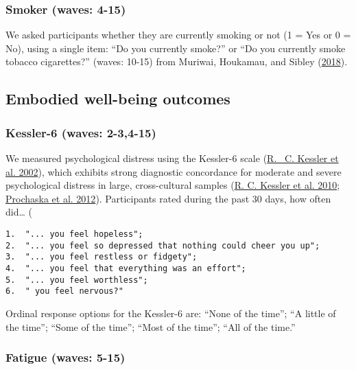 \documentclass[
  singlecolumn]{report}
\begin{document}
\hypertarget{smoker-waves-4-15}{%
\subsubsection{Smoker (waves: 4-15)}\label{smoker-waves-4-15}}

We asked participants whether they are currently smoking or not (1 = Yes
or 0 = No), using a single item: ``Do you currently smoke?'' or ``Do you
currently smoke tobacco cigarettes?'' (waves: 10-15) from Muriwai,
Houkamau, and Sibley
(\protect\hyperlink{ref-muriwai_looking_2018}{2018}).

\hypertarget{embodied-well-being-outcomes}{%
\subsection{Embodied well-being
outcomes}\label{embodied-well-being-outcomes}}

\hypertarget{kessler-6-waves-2-34-15}{%
\subsubsection{Kessler-6 (waves:
2-3,4-15)}\label{kessler-6-waves-2-34-15}}

We measured psychological distress using the Kessler-6 scale
(\protect\hyperlink{ref-kessler2002}{R. ~C. Kessler et al. 2002}), which
exhibits strong diagnostic concordance for moderate and severe
psychological distress in large, cross-cultural samples
(\protect\hyperlink{ref-kessler2010}{R. C. Kessler et al. 2010};
\protect\hyperlink{ref-prochaska2012}{Prochaska et al. 2012}).
Participants rated during the past 30 days, how often did\ldots{} (

\begin{verbatim}
1.  "... you feel hopeless";
2.  "... you feel so depressed that nothing could cheer you up";
3.  "... you feel restless or fidgety";
4.  "... you feel that everything was an effort";
5.  "... you feel worthless";
6.  " you feel nervous?"
\end{verbatim}

Ordinal response options for the Kessler-6 are: ``None of the time'';
``A little of the time''; ``Some of the time''; ``Most of the time'';
``All of the time.''

\hypertarget{fatigue-waves-5-15}{%
\subsubsection{Fatigue (waves: 5-15)}\label{fatigue-waves-5-15}}
\end{document}
